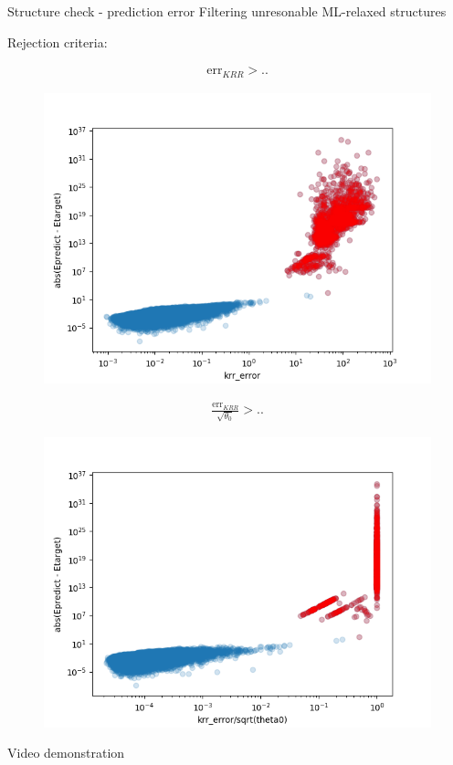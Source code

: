 \documentclass{beamer}
\begin{document}
\begin{frame}{Structure check - prediction error}
Filtering unresonable ML-relaxed structures

\bigskip

Rejection criteria:

\centering
\begin{minipage}{0.5\textwidth}
	\begin{align*}
	\text{err}_{KRR} > ..
	\end{align*}
	\begin{figure}
		\centering
		\includegraphics[width=\linewidth, trim={0 0 0 1.5cm}]{error_correlation}
		\caption*{}
	\end{figure}
\end{minipage}%
\begin{minipage}{0.5\textwidth}
	\begin{align*}
	\frac{\text{err}_{KRR}}{\sqrt{\theta_0}} > ..
	\end{align*}
	\begin{figure}
		\centering
		\includegraphics[width=\linewidth, trim={0 0 0 2.2cm}]{error_correlation_theta}
		\caption*{}
	\end{figure}
\end{minipage}
\end{frame}

\begin{frame}{Video demonstration}
\end{frame}
\end{document}
